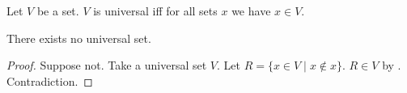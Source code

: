 \begin{definition}\label{universal_set}
    Let $V$ be a set.
    $V$ is universal iff
    for all sets $x$ we have $x\in V$.
\end{definition}

\begin{theorem}\label{no_universal_set}
    There exists no universal set.
\end{theorem}
\begin{proof}
    Suppose not.
    Take a universal set $V$.
    Let $R = \{ x\in V \mid x\not\in x \}$.
    $R\in V$ by .
    Contradiction.
\end{proof}
